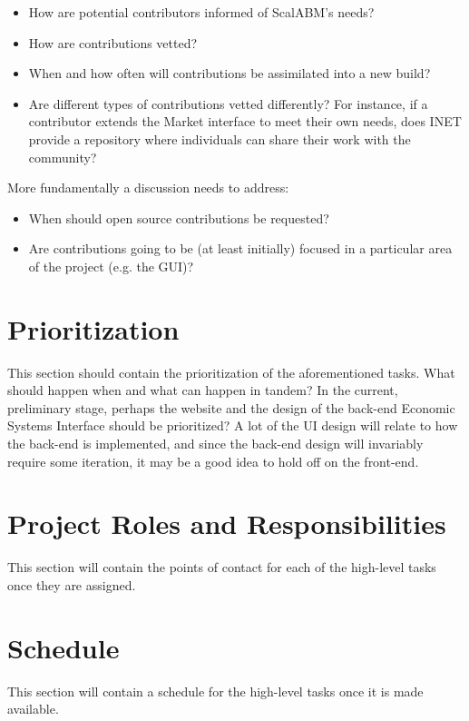 \documentclass[a4paper]{article}
\begin{document}
\begin{itemize}
\item How are potential contributors informed of ScalABM's needs? 
\item How are contributions vetted? 
\item When and how often will contributions be assimilated into a new build? 
\item Are different types of contributions vetted differently? For instance, if a contributor extends the Market interface to meet their own needs, does INET provide a repository where individuals can share their work with the community?
\end{itemize}

More fundamentally a discussion needs to address: 

\begin{itemize}
\item When should open source contributions be requested?
\item Are contributions going to be (at least initially) focused in a particular area of the project (e.g. the GUI)?
\end{itemize}

\section{Prioritization}

This section should contain the prioritization of the aforementioned tasks. What should happen when and what can happen in tandem? In the current, preliminary stage, perhaps the website and the design of the back-end Economic Systems Interface should be prioritized? A lot of the UI design will relate to how the back-end is implemented, and since the back-end design will invariably require some iteration, it may be a good idea to hold off on the front-end.

\section{Project Roles and Responsibilities}

This section will contain the points of contact for each of the high-level tasks once they are assigned. 

\section{Schedule}

This section will contain a schedule for the high-level tasks once it is made available. 
\end{document}
